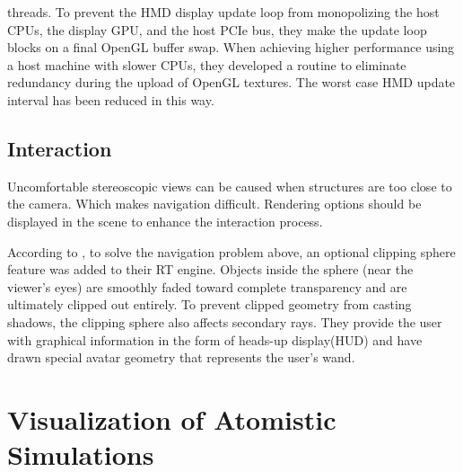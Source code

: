 \documentclass[10pt,twocolumn,letterpaper]{article}
\begin{document}
threads. To prevent the HMD display update loop from monopolizing the host CPUs, the display GPU, and the host PCIe bus, they make the update loop blocks on a final OpenGL buffer swap. When achieving higher performance using a host machine with slower CPUs, they developed a routine to eliminate redundancy during the upload of OpenGL textures. The worst case HMD update interval has been reduced in this way.

\subsection{Interaction}
Uncomfortable stereoscopic views can be caused when structures are too close to the camera. Which makes navigation difficult. Rendering options should be displayed in the scene to enhance the interaction process.

According to \cite{stone_immersive_2016}, to solve the navigation problem above, an optional clipping sphere feature was added to their RT engine. Objects inside the sphere (near the viewer’s eyes) are smoothly faded toward complete transparency and are ultimately clipped out entirely. To prevent clipped geometry from casting shadows, the clipping sphere also affects secondary rays. They provide the user with graphical information in the form of heads-up display(HUD) and have drawn special avatar geometry that represents the user’s wand.

\section{Visualization of Atomistic Simulations}
\end{document}
